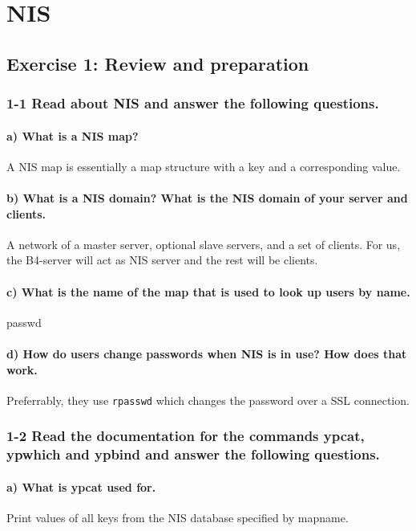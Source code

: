 
\chapter{NIS}
\section{Exercise 1: Review and preparation}
\subsection{1-1 Read about NIS and answer the following questions.}
\subsubsection{a) What is a NIS map?}
A NIS map is essentially a map structure with a key and a corresponding value.

\subsubsection{b) What is a NIS domain? What is the NIS domain of your server and clients.}
A network of a master server, optional slave servers, and a set of clients. For us, the B4-server will act as NIS server and the rest will be clients.

\subsubsection{c) What is the name of the map that is used to look up users by name.}
passwd

\subsubsection{d) How do users change passwords when NIS is in use? How does that work.}
Preferrably, they use \verb=rpasswd= which changes the password over a SSL connection.

\subsection{1-2 Read the documentation for the commands ypcat, ypwhich and ypbind and answer the following questions.}
\subsubsection{a) What is ypcat used for.}
Print values of all keys from the NIS database specified by mapname.


